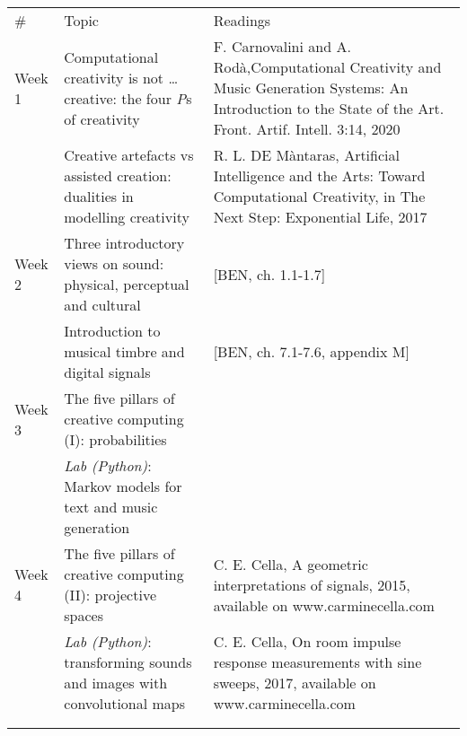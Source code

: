 \documentclass[letterpaper]{inzane_syllabus} %
\begin{document}
\begin{center}
\begin{tabularx}{\textwidth}{p{2cm}p{8cm} @{\hskip 0.5cm} p{9.5cm}} %
\arrayrulecolor{myCOLOR}\hline
\hline 
\hline 

\multicolumn{3}{l}{\textbf{\textcolor{myCOLOR}{\large MODULE 1: Foundations }}} \\
\hline
  \# & Topic & Readings \\ \hline 
Week 1 &
Computational creativity is not \ldots creative: the four \emph{P}s of creativity & F. Carnovalini and A. Rod\`a,Computational Creativity and Music Generation Systems: An Introduction to the State of the Art. Front. Artif. Intell. 3:14, 2020  \\

& Creative artefacts vs assisted creation: dualities in modelling creativity &  R. L. DE M\`antaras, Artificial Intelligence and the Arts: Toward Computational Creativity, in The Next Step: Exponential Life, 2017\\
\arrayrulecolor{maingray}\hline

Week 2 & Three introductory views on sound: physical, perceptual and cultural & [BEN, ch. 1.1-1.7]\\

& Introduction to musical timbre and digital signals & [BEN, ch. 7.1-7.6, appendix M]\\
\arrayrulecolor{maingray}\hline

Week 3 & The five pillars of creative computing (I): probabilities &  \\

& \emph{Lab (Python)}: Markov models for text and music generation & \\
\arrayrulecolor{maingray}\hline

Week 4 & The five pillars of creative computing (II): projective spaces & C. E. Cella, A geometric interpretations of signals, 2015, available on www.carminecella.com\\

& \emph{Lab (Python)}: transforming sounds and images with convolutional maps & C. E. Cella, On room impulse response measurements with sine sweeps, 2017, available on www.carminecella.com \\
& & \\ 
\arrayrulecolor{maingray}\hline


\end{tabularx}
\end{center}
\end{document}
